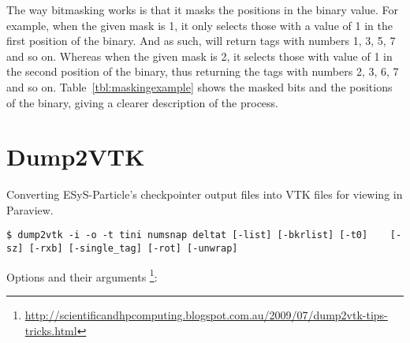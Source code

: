 The way bitmasking works is that it masks the positions in the binary value. For example, when the given mask is 1, it only selects those with a value of 1 in the first position of the binary. And as such, will return tags with numbers 1, 3, 5, 7 and so on. Whereas when the given mask is 2, it selects those with value of 1 in the second position of the binary, thus returning the tags with numbers 2, 3, 6, 7 and so on.  Table~\ref{tbl:maskingexample} shows the masked bits and the positions of the binary, giving a clearer description of the process.


\section{Dump2VTK}
\label{sec:dump2vtk}

Converting ESyS-Particle's checkpointer output files into VTK files for viewing in Paraview.

\begin{lstlisting}[style=inlineBash]
$ dump2vtk -i -o -t tini numsnap deltat [-list] [-bkrlist] [-t0]    [-sz] [-rxb] [-single_tag] [-rot] [-unwrap] 
\end{lstlisting}

Options and their arguments \footnote{\url{http://scientificandhpcomputing.blogspot.com.au/2009/07/dump2vtk-tips-tricks.html}}:

